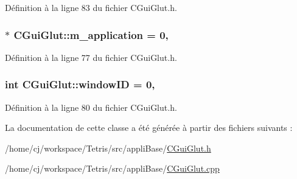 Définition à la ligne 83 du fichier C\-Gui\-Glut.\-h.

\hypertarget{class_c_gui_glut_af1cfef33678aad68798ac49e595dcb4a}{
\subsubsection[{m\-\_\-application}]{ $\ast$ C\-Gui\-Glut\-::m\-\_\-application = 0\hspace{0.3cm}{\ttfamily [static]}, {\ttfamily [protected]}}}\label{class_c_gui_glut_af1cfef33678aad68798ac49e595dcb4a}


Définition à la ligne 77 du fichier C\-Gui\-Glut.\-h.

\hypertarget{class_c_gui_glut_a4878717c11f5a307853512a09de37310}{
\subsubsection[{window\-I\-D}]{\setlength{\rightskip}{0pt plus 5cm}int C\-Gui\-Glut\-::window\-I\-D = 0\hspace{0.3cm}{\ttfamily [static]}, {\ttfamily [protected]}}}\label{class_c_gui_glut_a4878717c11f5a307853512a09de37310}


Définition à la ligne 80 du fichier C\-Gui\-Glut.\-h.



La documentation de cette classe a été générée à partir des fichiers suivants \-:\begin{DoxyCompactItemize}
\item 
/home/cj/workspace/\-Tetris/src/appli\-Base/\hyperlink{_c_gui_glut_8h}{C\-Gui\-Glut.\-h}\item 
/home/cj/workspace/\-Tetris/src/appli\-Base/\hyperlink{_c_gui_glut_8cpp}{C\-Gui\-Glut.\-cpp}\end{DoxyCompactItemize}
